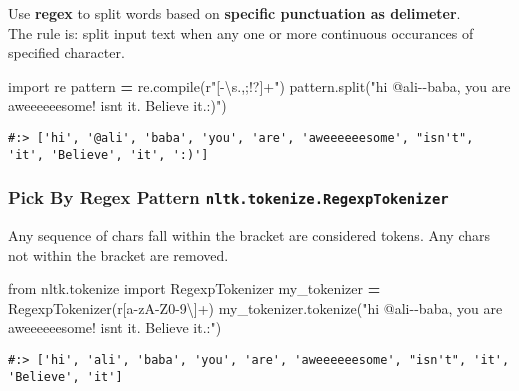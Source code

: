 \documentclass[
]{book}
\newenvironment{Shaded}{\begin{snugshade}}{\end{snugshade}}
\newcommand{\BuiltInTok}[1]{#1}
\newcommand{\ImportTok}[1]{#1}
\newcommand{\NormalTok}[1]{#1}
\newcommand{\OperatorTok}[1]{\textcolor[rgb]{0.43,0.43,0.43}{\textbf{#1}}}
\newcommand{\StringTok}[1]{\textcolor[rgb]{0.5,0.5,0.5}{#1}}
\newcommand{\VerbatimStringTok}[1]{\textcolor[rgb]{0.5,0.5,0.5}{#1}}
\begin{document}
Use \textbf{regex} to split words based on \textbf{specific punctuation as delimeter}.\\
The rule is: split input text when any one or more continuous occurances of specified character.

\begin{Shaded}
\begin{Highlighting}[]
\ImportTok{import}\NormalTok{ re}
\NormalTok{pattern }\OperatorTok{=}\NormalTok{ re.}\BuiltInTok{compile}\NormalTok{(}\VerbatimStringTok{r"[{-}\textbackslash{}s.,;!?]+"}\NormalTok{)}
\NormalTok{pattern.split(}\StringTok{"hi @ali{-}{-}baba, you are aweeeeeesome! isn\textquotesingle{}t it. Believe it.:)"}\NormalTok{)}
\end{Highlighting}
\end{Shaded}

\begin{verbatim}
#:> ['hi', '@ali', 'baba', 'you', 'are', 'aweeeeeesome', "isn't", 'it', 'Believe', 'it', ':)']
\end{verbatim}

\hypertarget{pick-by-regex-pattern-nltk.tokenize.regexptokenizer}{%
\subsubsection{\texorpdfstring{Pick By Regex Pattern \texttt{nltk.tokenize.RegexpTokenizer}}{Pick By Regex Pattern nltk.tokenize.RegexpTokenizer}}\label{pick-by-regex-pattern-nltk.tokenize.regexptokenizer}}

Any sequence of chars fall within the bracket are considered tokens. Any chars not within the bracket are removed.

\begin{Shaded}
\begin{Highlighting}[]
\ImportTok{from}\NormalTok{ nltk.tokenize }\ImportTok{import}\NormalTok{ RegexpTokenizer}
\NormalTok{my\_tokenizer }\OperatorTok{=}\NormalTok{ RegexpTokenizer(}\VerbatimStringTok{r\textquotesingle{}[a{-}zA{-}Z0{-}9\textbackslash{}\textquotesingle{}]+\textquotesingle{}}\NormalTok{)}
\NormalTok{my\_tokenizer.tokenize(}\StringTok{"hi @ali{-}{-}baba, you are aweeeeeesome! isn\textquotesingle{}t it. Believe it.:"}\NormalTok{)}
\end{Highlighting}
\end{Shaded}

\begin{verbatim}
#:> ['hi', 'ali', 'baba', 'you', 'are', 'aweeeeeesome', "isn't", 'it', 'Believe', 'it']
\end{verbatim}
\end{document}
